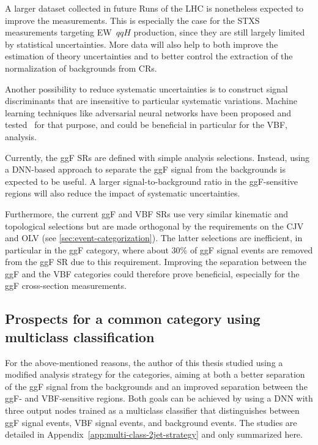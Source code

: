 A larger dataset collected in future Runs of the LHC is nonetheless expected to improve the measurements. This is especially the case for the STXS measurements targeting EW~$qqH$ production, since they are still largely limited by statistical uncertainties. 
More data will also help to both improve the estimation of theory uncertainties and to better control the extraction of the normalization of backgrounds from CRs. 

Another possibility to reduce systematic uncertainties is to construct signal discriminants that are insensitive to particular systematic variations. Machine learning techniques like adversarial neural networks have been proposed and tested~\cite{Englert2019,adversarialClavijoJoseM} for that purpose, and could be beneficial in particular for the VBF, \HWW analysis.

Currently, the ggF SRs are defined with simple analysis selections. Instead, using a DNN-based approach to separate the ggF signal from the backgrounds is expected to be useful. 
A larger signal-to-background ratio in the ggF-sensitive regions will also reduce the impact of systematic uncertainties. 

Furthermore, the current ggF and VBF \TwoJet SRs use very similar kinematic and topological selections but are made orthogonal by the requirements on the CJV and OLV (see \cref{sec:event-categorization}). The latter selections are inefficient, in particular in the ggF \TwoJet category, where about 30\% of ggF signal events are removed from the ggF SR due to this requirement. Improving the separation between the ggF \TwoJet and the VBF \TwoJet categories could therefore prove beneficial, especially for the ggF \TwoJet cross-section measurements. 

\subsection{Prospects for a common \TwoJet category using multiclass classification}
For the above-mentioned reasons, the author of this thesis studied using a modified analysis strategy for the \TwoJet categories, aiming at both a better separation of the ggF signal from the backgrounds and an improved separation between the ggF- and VBF-sensitive \TwoJet regions. 
Both goals can be achieved by using a DNN with three output nodes trained as a multiclass classifier that distinguishes between ggF signal events, VBF signal events, and background events. The studies are detailed in Appendix~\ref{app:multi-class-2jet-strategy} and only summarized here. 

